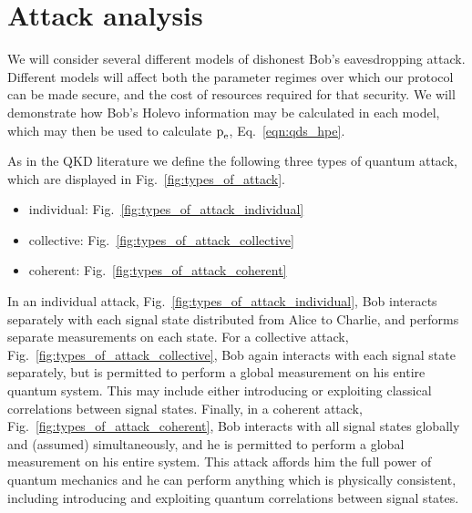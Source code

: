 \section{Attack analysis}\label{sec:qds_attack_analysis}
We will consider several different models of dishonest Bob's eavesdropping attack. Different models will affect both the parameter regimes over which our protocol can be made secure, and the cost of resources required for that security. We will demonstrate how Bob's Holevo information may be calculated in each model, which may then be used to calculate $\text{p}_{\text{e}}$, Eq.~\ref{eqn:qds_hpe}.

As in the QKD literature \cite{Lutkenhaus2004} we define the following three types of quantum attack, which are displayed in Fig.~\ref{fig:types_of_attack}.
\begin{itemize}
\item individual: Fig.~\ref{fig:types_of_attack_individual}
\item collective: Fig.~\ref{fig:types_of_attack_collective}
\item coherent: Fig.~\ref{fig:types_of_attack_coherent}
\end{itemize}
In an individual attack, Fig.~\ref{fig:types_of_attack_individual}, Bob interacts separately with each signal state distributed from Alice to Charlie, and performs separate measurements on each state. For a collective attack, Fig.~\ref{fig:types_of_attack_collective}, Bob again interacts with each signal state separately, but is permitted to perform a global measurement on his entire quantum system. This may include either introducing or exploiting classical correlations between signal states. Finally, in a coherent attack, Fig.~\ref{fig:types_of_attack_coherent}, Bob interacts with all signal states globally and (assumed) simultaneously, and he is permitted to perform a global measurement on his entire system. This attack affords him the full power of quantum mechanics and he can perform anything which is physically consistent, including introducing and exploiting quantum correlations between signal states.


